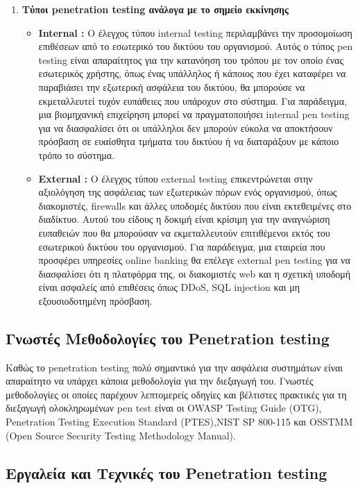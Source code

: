{\begin{enumerate}
\begin{itemize}
    \end{itemize}
    \item{\textbf{ Τύποι \lt penetration testing \gt ανάλογα με το σημείο εκκίνησης}}
    \begin{itemize}
        \item \textbf{\lt Internal :} \gt Ο έλεγχος τύπου \lt internal  testing \gt περιλαμβάνει την προσομοίωση επιθέσεων από το εσωτερικό του δικτύου του οργανισμού. Αυτός ο τύπος \lt pen testing \gt είναι απαραίτητος για την κατανόηση του τρόπου με τον οποίο ένας εσωτερικός χρήστης, όπως ένας υπάλληλος ή κάποιος που έχει καταφέρει να παραβιάσει την εξωτερική ασφάλεια του δικτύου, θα μπορούσε να εκμεταλλευτεί τυχόν ευπάθειες που υπάροχυν στο σύστημα. Για παράδειγμα, μια βιομηχανική επιχείρηση μπορεί να πραγματοποιήσει \lt internal pen testing \gt για να διασφαλίσει ότι οι υπάλληλοι δεν μπορούν εύκολα να αποκτήσουν πρόσβαση σε ευαίσθητα τμήματα του δικτύου ή να διαταράξουν με κάποιο τρόπο το σύστημα.
        \item \textbf{\lt External :} \gt Ο έλεγχος τύπου \lt external  testing \gt  επικεντρώνεται στην αξιολόγηση της ασφάλειας των εξωτερικών πόρων ενός οργανισμού, όπως διακομιστές, \lt firewalls \gt και άλλες υποδομές δικτύου που είναι εκτεθειμένες στο διαδίκτυο. Αυτού του είδους η δοκιμή είναι κρίσιμη για την αναγνώριση ευπαθειών που θα μπορούσαν να εκμεταλλευτούν επιτιθέμενοι εκτός του εσωτερικού δικτύου του οργανισμού. Για παράδειγμα, μια  εταιρεία που προσφέρει υπηρεσίες \lt online banking \gt  θα επέλεγε  \lt external pen testing \gt  για να διασφαλίσει ότι η πλατφόρμα της, οι διακομιστές web και η σχετική υποδομή είναι ασφαλείς από επιθέσεις όπως \lt DDoS, SQL injection \gt και μη εξουσιοδοτημένη πρόσβαση.
    \end{itemize}
\end{enumerate}
}
\subsection{\gt Γνωστές Μεθοδολογίες του \lt Penetration testing}
\hspace*{2em}Καθώς το \lt penetration testing  πολύ σημαντικό για την ασφάλεια συστημάτων είναι απαραίτητο να υπάρχει κάποια μεθοδολογία για την διεξαγωγή του. Γνωστές μεθοδολογίες οι οποίες παρέχουν λεπτομερείς οδηγίες και βέλτιστες πρακτικές για τη διεξαγωγή ολοκληρωμένων \lt pen test \gt είναι οι \lt OWASP Testing Guide (OTG), Penetration Testing Execution Standard (PTES),NIST SP 800-115 και \lt OSSTMM (Open Source Security Testing Methodology Manual).\gt
\subsection{\gt Εργαλεία και Τεχνικές του \lt Penetration testing}
